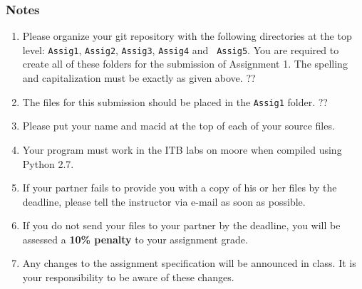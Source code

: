 \documentclass[12pt]{article}
\begin{document}
\subsubsection*{Notes}
\begin{enumerate}
\item Please organize your git repository with the following directories at the
  top level: {\tt Assig1}, {\tt Assig2}, {\tt Assig3}, {\tt Assig4} and {\tt
    Assig5}. You are required to create all of these folders for the submission
  of Assignment 1.  The spelling and capitalization must be exactly as given
  above. ??
\item The files for this submission should be placed in the {\tt Assig1}
  folder. ??
\item Please put your name and macid at the top of each of your source
  files.
\item Your program must work in the ITB labs on moore when compiled using Python
  2.7.  
\item If your partner fails to provide you with a copy of his or her files by
  the deadline, please tell the instructor via e-mail as soon as possible.
\item If you do not send your files to your partner by the deadline, you will be
  assessed a \textbf{10\% penalty} to your assignment grade.
\item Any changes to the assignment specification will be announced in class.
  It is your responsibility to be aware of these changes.
\end{enumerate}
\end{document}
